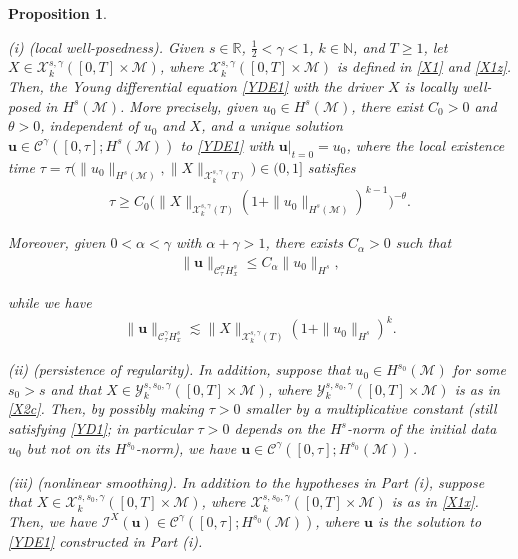 \documentclass[letterpaper, 11pt,  reqno]{amsart}
\newtheorem{proposition}[theorem]{Proposition}
\newcommand{\1}{\hspace{0.5mm}\text{I}\hspace{0.5mm}}
\newcommand{\I}{\mathcal{I}}
\newcommand{\noi}{\noindent}
\newcommand{\R}{\mathbb{R}}
\newcommand{\CC}{\mathcal{C}}
\newcommand{\al}{\alpha}
\newcommand{\g}{\gamma}
\newcommand{\ta}{\theta}
\newcommand{\les}{\lesssim}
\newcommand{\M}{\mathcal{M}}
\newcommand{\N}{\mathbb{N}}
\newcommand{\cC}{\mathcal{C}}
\newcommand{\cX}{\mathcal{X}}
\newcommand{\cY}{\mathcal{Y}}
\newcommand{\uu}{\mathbf{u}}
\numberwithin{equation}{section}
\numberwithin{theorem}{section}
\begin{document}
\begin{proposition}
\label{PROP:main}

\textup{(i) (local well-posedness).}
Given   $s \in \R$, $\frac 12 < \g < 1$,  $k \in \N$, and $T \ge 1$, 
let     $X \in \cX^{s, \g}_k([0, T]\times \M)$, 
where $ \cX^{s, \g}_k([0, T]\times \M)$ is  defined  in \eqref{X1}
and \eqref{X1z}.
Then, 
 the Young differential equation \eqref{YDE1} with 
 the driver $X$ 
is locally well-posed in $H^s(\M)$.
More precisely, given  $u_0\in H^s(\M)$, 
there exist $C_0 >0$ and   $\ta>0$, independent of $u_0$ and $X$, 
and 
 a unique solution $\uu \in \cC^\g([0, \tau]; H^s(\M))$
   to 
 \eqref{YDE1}  
with $\uu|_{t= 0} = u_0$, where the local existence time $\tau = 
\tau\big(\|u_0\|_{H^s(\M)}, \|X\|_{\cX^{s, \g}_k(T)}\big) \in (0, 1]$
satisfies 
\begin{align}
\tau \ge  C_0 
\Big(\|X\|_{\cX^{s,\g}_k(T)}  (1+ \|u_0\|_{H^s(\M)})^{k-1}\Big)^{-\ta}.
\label{YD1}
\end{align}

\noi
Moreover, given $0 < \al < \g$
with $\al + \g > 1$, 
there exists $C_\al > 0$ 
such that 
\begin{align}
\| \uu \|_{\CC^\al_\tau H^s_x}\le C_\al \|u_0\|_{H^s}, 
\label{YD1a}
\end{align}


\noi
while we have
\begin{align}
\| \uu \|_{\CC^\g_\tau H^s_x}\les \|X\|_{\cX^{s,\g}_k(T)}  (1+\|u_0\|_{H^s})^k.
\label{YD1b}
\end{align}



\smallskip

\noi
\textup{(ii) (persistence of regularity).}
In addition, suppose that $u_0 \in H^{s_0}(\M)$ for some $s_0 > s$
and that  $X \in \cY^{s, s_0, \g}_k([0, T]\times \M)$, 
where $\cY^{s, s_0, \g}_k([0, T]\times \M)$  is  as in \eqref{X2c}.
Then, 
by possibly making $\tau > 0$ smaller by a multiplicative constant 
\textup{(}still satisfying \eqref{YD1}\textup{;} in particular $\tau > 0$
depends on the $H^s$-norm of the initial data $u_0$
but not on its $H^{s_0}$-norm\textup{)}, 
we have $\uu \in \cC^\g([0, \tau]; H^{s_0}(\M))$.


\smallskip

\noi
\textup{(iii) (nonlinear smoothing).}
In addition to the hypotheses in Part (i), 
suppose  that  $X \in \cX^{s, s_0, \g}_k([0, T]\times \M)$, 
where $\cX^{s, s_0, \g}_k([0, T]\times \M)$  is  as in \eqref{X1x}.
Then, we have
 $\I^X(\uu) \in \cC^\g([0, \tau]; H^{s_0}(\M))$, 
 where $\uu$ is the solution to \eqref{YDE1}
 constructed in Part (i).





\end{proposition}
\end{document}

